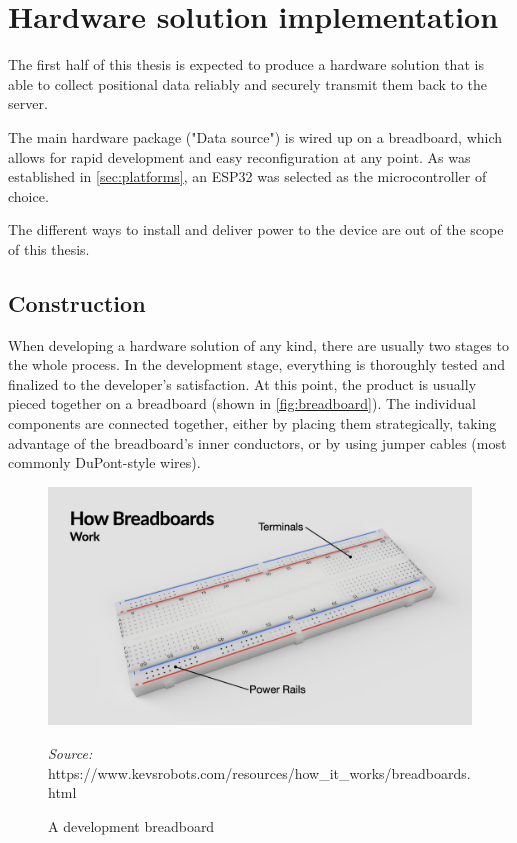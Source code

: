 \documentclass[FM,BP,EN,fonts]{tulthesis}
\begin{document}
\chapter{Hardware solution implementation}
The first half of this thesis is expected to produce a hardware solution that is able to collect positional data reliably and securely transmit them back to the server. 

The main hardware package ("Data source") is wired up on a breadboard, which allows for rapid development and easy reconfiguration at any point. As was established in \autoref{sec:platforms}, an ESP32 was selected as the microcontroller of choice.

The different ways to install and deliver power to the device are out of the scope of this thesis.

\section{Construction}
When developing a hardware solution of any kind, there are usually two stages to the whole process. In the development stage, everything is thoroughly tested and finalized to the developer's satisfaction. At this point, the product is usually pieced together on a breadboard (shown in \autoref{fig:breadboard}). The individual components are connected together, either by placing them strategically, taking advantage of the breadboard's inner conductors, or by using jumper cables (most commonly DuPont-style wires).

\begin{figure}[ht]
    \centering
    \includegraphics[scale=.2]{media/breadboard.jpg}
    \caption{A development breadboard}
    \textit{Source:} https://www.kevsrobots.com/resources/how\_it\_works/breadboards.html
    \label{fig:breadboard}
\end{figure}
\end{document}
